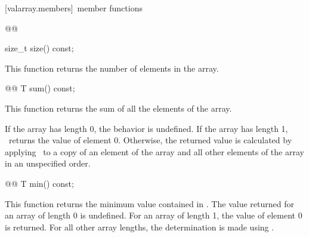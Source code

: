 \documentclass[american,twoside]{book}
\begin{document}
\begin{paras}
[valarray.members]{\ member functions}

\begin{itemdecl}
@@
\end{itemdecl}

\begin{itemdescr}
\pnum
{}

\pnum
{}

\pnum
{}
\end{itemdescr}

%
\begin{itemdecl}
size_t size() const;
\end{itemdecl}

\begin{itemdescr}
\pnum
This function returns the number of elements in the array.
\end{itemdescr}

%
\begin{itemdecl}
@@ T sum() const;
\end{itemdecl}

\begin{itemdescr}
This function returns the sum of all the elements of the array.

\pnum
If the array has length 0, the behavior is undefined.%
If the array has length 1,
\
returns the value of element 0.
Otherwise, the returned value is calculated by applying
\tcode{operator+=}\
to a copy of an element of the array and
all other elements of the array in an unspecified order.%
\end{itemdescr}

%
\begin{itemdecl}
@@ T min() const;
\end{itemdecl}

\begin{itemdescr}
\pnum
This function returns the minimum value contained in
\tcode{*this}.
The value returned for an array of length 0 is undefined.
For an array
of length 1, the value of element 0 is returned.
For all other array
lengths, the determination is made using
\tcode{operator<}.
\end{itemdescr}


\end{paras}
\end{document}
